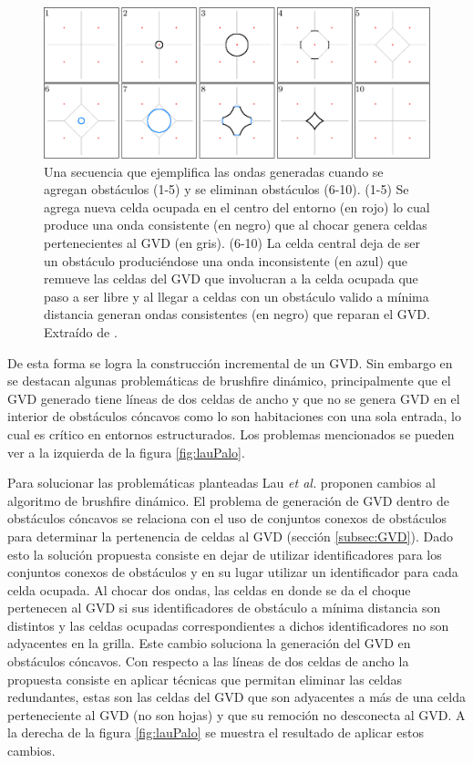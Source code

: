 \begin{figure}[H]
  \center
  \includegraphics[width=1\linewidth]{imagenes/wavesKalra.png}
  \caption[Ondas de brushfire dinámico.]{Una secuencia que ejemplifica las ondas generadas cuando se agregan obstáculos (1-5) y se eliminan obstáculos (6-10). (1-5) Se agrega nueva celda ocupada en el centro del entorno (en rojo) lo cual produce una onda consistente (en negro) que al chocar genera celdas pertenecientes al GVD (en gris). (6-10) La celda central deja de ser un obstáculo produciéndose una onda inconsistente (en azul) que remueve las celdas del GVD que involucran a la celda ocupada que paso a ser libre y al llegar a celdas con un obstáculo valido a mínima distancia generan ondas consistentes (en negro) que reparan el GVD. Extraído de \cite{kalra2009incremental}.}\label{fig:ejWavesIncKarlra}
\end{figure} 


De esta forma se logra la construcción incremental de un GVD. Sin embargo en \cite{Lau2013} se destacan algunas problemáticas de brushfire dinámico, principalmente que el GVD generado tiene líneas de dos celdas de ancho y que no se genera GVD en el interior de obstáculos cóncavos como lo son habitaciones con una sola entrada, lo cual es crítico en entornos estructurados. Los problemas mencionados se pueden ver a la izquierda de la figura \ref{fig:lauPalo}.

Para solucionar las problemáticas planteadas Lau \textit{et al.}
proponen cambios al algoritmo de brushfire dinámico. El problema de
generación de GVD dentro de obstáculos cóncavos se relaciona con el uso de
conjuntos conexos de obstáculos para determinar la pertenencia de celdas
al GVD (sección \ref{subsec:GVD}). Dado esto la solución propuesta
consiste en dejar de utilizar identificadores para los conjuntos conexos
de obstáculos y en su lugar utilizar un identificador para cada celda
ocupada. Al chocar dos ondas, las celdas en donde se da el choque
pertenecen al GVD si sus identificadores de obstáculo a mínima distancia
son distintos y las celdas ocupadas correspondientes a dichos
identificadores no son adyacentes en la grilla. Este cambio soluciona la
generación del GVD en obstáculos cóncavos. Con respecto a las líneas de
dos celdas de ancho la propuesta consiste en aplicar técnicas que
permitan eliminar las celdas redundantes, estas son las celdas del GVD
que son adyacentes a más de una celda perteneciente al GVD (no son
hojas) y que su remoción no desconecta al GVD. A la derecha de la figura
\ref{fig:lauPalo} se muestra el resultado de aplicar estos cambios.

